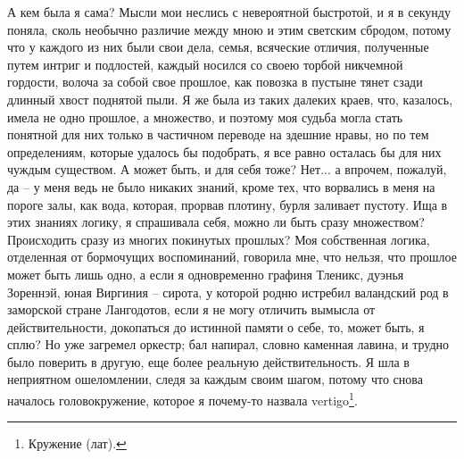А кем была я сама? Мысли мои  неслись с невероятной быстротой, и я в секунду
поняла, сколь необычно  различие между мною и этим  светским сбродом, потому
что у  каждого из них были  свои дела, семья, всяческие  отличия, полученные
путем интриг и подлостей, каждый носился со своею торбой никчемной гордости,
волоча за  собой свое  прошлое, как  повозка в  пустыне тянет  сзади длинный
хвост поднятой пыли. Я же была  из таких далеких краев, что, казалось, имела
не одно прошлое, а множество, и  поэтому моя судьба могла стать понятной для
них только  в частичном переводе на  здешние нравы, но по  тем определениям,
которые  удалось бы  подобрать,  я  все равно  осталась  бы  для них  чуждым
существом. А  может быть,  и для  себя тоже? Нет...  а впрочем,  пожалуй, да
--  у  меня  ведь  не  было  никаких знаний,  кроме  тех,  что  ворвались  в
меня  на пороге  залы, как  вода, которая,  прорвав плотину,  бурля заливает
пустоту.  Ища в  этих  знаниях  логику, я  спрашивала  себя,  можно ли  быть
сразу  множеством?  Происходить  сразу  из  многих  покинутых  прошлых?  Моя
собственная  логика, отделенная  от бормочущих  воспоминаний, говорила  мне,
что  нельзя,  что прошлое  может  быть  лишь  одно,  а если  я  одновременно
графиня Тленикс, дуэнья  Зореннэй, юная Виргиния -- сирота,  у которой родню
истребил  валандский род  в  заморской  стране Лангодотов,  если  я не  могу
отличить вымысла от действительности, докопаться  до истинной памяти о себе,
то,  может быть,  я  сплю?  Но уже  загремел  оркестр;  бал напирал,  словно
каменная  лавина,  и трудно  было  поверить  в  другую, еще  более  реальную
действительность.  Я шла  в неприятном  ошеломлении, следя  за каждым  своим
шагом, потому что снова началось головокружение, которое я почему-то назвала
vertigo\footnote{Кружение (лат).}.

